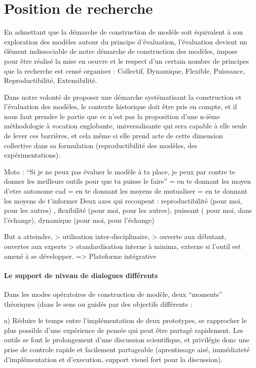 
\section{Position de recherche}

En admettant que la démarche de construction de modèle soit équivalent à son exploration des modèles autour du principe d'évaluation, l'évaluation devient un élément indissociable de notre démarche de construction des modèles, impose pour être réalisé la mise en oeuvre et le respect d'un certain nombre de principes que la recherche est censé organiser : Collectif, Dynamique, Flexible, Puissance, Reproductibilité, Extensibilité. 

Dans notre volonté de proposer une démarche systématisant la construction et l'évaluation des modèles, le contexte historique doit être pris en compte, et il nous faut prendre le partie que ce n'est pas la proposition d'une n-ième méthodologie à vocation englobante, universalisante qui sera capable à elle seule de lever ces barrières, et cela même si elle prend acte de cette dimension collective dans sa formulation (reproductibilité des modèles, des expérimentations).

Moto : \enquote{Si je ne peux pas évaluer le modèle à ta place, je peux par contre te donner les meilleurs outils pour que tu puisse le faire} 
= en te donnant les moyen d'etre autonome cad
= en te donnant les moyens de mutualiser
= en te donnant les moyens de t'informer 
Deux axes qui recoupent : reproductibilité (pour moi, pour les autres) , flexibilité (pour moi, pour les autres), puissant ( pour moi, dans l'échange), dynamique (pour moi, pour l'échange)

But a atteindre, 
> utilisation inter-disciplinaire, 
> ouverte aux débutant, ouvertes aux experts
> standardisation interne à minima, externe si l'outil est amené à se développer.
=> Plateforme intégrative 

\paragraph{Le support de niveau de dialogues différents}

Dans les modes opératoires de construction de modèle, deux \enquote{moments} théoriques (dans le sens ou guidés par des objectifs différents : 

a) Réduire le temps entre l'implémentation de deux prototypes, se rapprocher le plus possible d'une expérience de pensée qui peut être partagé rapidement. Les outils se font le prolongement d'une discussion scientifique, et privilégie donc une prise de controle rapide et facilement partageable (aprentissage aisé, immédiateté d'implémentation et d'execution, support visuel fort pour la discussion).

